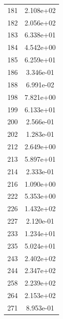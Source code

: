 \documentclass[12pt]{article}
\begin{document}
\begin{longtable}{@{}cc@{}}
181 & 2.108e+02 \\
182 & 2.056e+02 \\
183 & 6.338e+01 \\
184 & 4.542e+00 \\
185 & 6.259e+01 \\
186 & 3.346e-01 \\
188 & 6.991e-02 \\
198 & 7.821e+00 \\
199 & 6.133e+01 \\
200 & 2.566e-01 \\
202 & 1.283e-01 \\
212 & 2.649e+00 \\
213 & 5.897e+01 \\
214 & 2.333e-01 \\
216 & 1.090e+00 \\
222 & 5.353e+00 \\
226 & 1.432e+02 \\
227 & 2.120e-01 \\
233 & 1.234e+01 \\
235 & 5.024e+01 \\
243 & 2.402e+02 \\
244 & 2.347e+02 \\
258 & 2.239e+02 \\
264 & 2.153e+02 \\
271 & 8.953e-01 \\

\bottomrule
\end{longtable}
\end{document}
